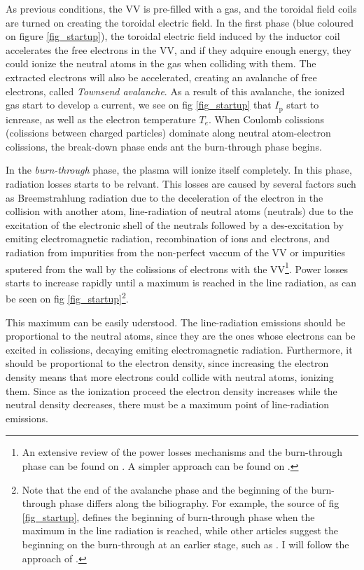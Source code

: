 \documentclass[a4paper,12pt,oneside]{book}
\begin{document}
As previous conditions, the VV is pre-filled with a gas, and the toroidal field coils are turned on creating the toroidal electric field. 
In the first phase (blue coloured on figure \ref{fig_startup}), the toroidal electric field induced by the inductor coil accelerates the free electrons in the VV, and if they adquire enough energy, they could ionize the neutral atoms in the gas when colliding with them. The extracted electrons will also be accelerated, creating an avalanche of free electrons, called \textit{Townsend avalanche}. As a result of this avalanche, the ionized gas start to develop a current, we see on fig \ref{fig_startup} that $I_\text{p}$ start to icnrease, as well as the electron temperature $T_e$. When Coulomb colissions (colissions between charged particles) dominate along neutral atom-electron colissions, the break-down phase ends ant the burn-through phase begins.

In the \textit{burn-through} phase, the plasma will ionize itself completely. In this phase, radiation losses starts to be relvant. This losses are caused by several factors such as Breemstrahlung radiation due to the deceleration of the electron in the collision with another atom, line-radiation of neutral atoms (neutrals) due to the excitation of the electronic shell of the neutrals followed by a des-excitation by emiting electromagnetic radiation, recombination of ions and electrons, and radiation from impurities from the non-perfect vaccum of the VV or impurities sputered from the wall by the colissions of electrons with the VV\footnote{An extensive review of the power losses mechanisms and the burn-through phase can be found on \cite{KimThesis}. A simpler approach can be found on \cite{Lloyd_1996}.}. Power losses starts to increase rapidly until a maximum is reached in the line radiation, as can be seen on fig \ref{fig_startup}\footnote{Note that the end of the avalanche phase and the beginning of the burn-through phase differs along the biliography. For example, the source of fig \ref{fig_startup}, \cite{TCV_thesis} defines the beginning of burn-through phase when the maximum in the line radiation is reached, while other articles suggest the beginning on the burn-through at an earlier stage, such as \cite{ITER_2019}. I will follow the approach of \cite{ITER_2019}.}.

This maximum can be easily uderstood. The line-radiation emissions should be proportional to the neutral atoms, since they are the ones whose electrons can be excited in colissions, decaying emiting electromagnetic radiation. Furthermore, it should be proportional to the electron density, since increasing the electron density means that more electrons could collide with neutral atoms, ionizing them. Since as the ionization proceed the electron density increases while the neutral density decreases, there must be a maximum point of line-radiation emissions.
\end{document}
